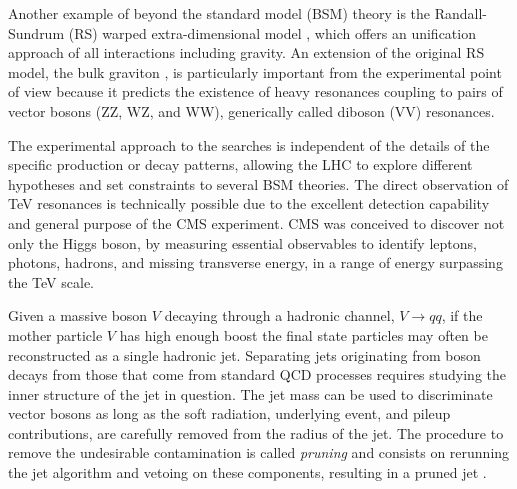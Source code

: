 Another example of beyond the standard model (BSM) theory is the Randall-Sundrum (RS) warped extra-dimensional model \cite{Randall:1999ee,Randall:1999vf}, which offers an unification approach of all interactions including gravity. An extension of the original RS model, the bulk graviton \cite{Agashe:2007zd}, is particularly important from the experimental point of view because it predicts the existence of heavy resonances coupling to pairs of vector bosons (ZZ, WZ, and WW), generically called diboson (VV) resonances.

The experimental approach to the searches is independent of the details of the specific production or decay patterns, allowing the LHC to explore different hypotheses and set constraints to several BSM theories. The direct observation of TeV resonances is technically possible due to the excellent detection capability and general purpose of the CMS experiment. CMS was conceived to discover not only the Higgs boson, by measuring essential observables to identify leptons, photons, hadrons, and missing transverse energy, in a range of energy surpassing the TeV scale. 

Given a massive boson $V$ decaying through a hadronic channel, $V \rightarrow qq$, if the mother particle $V$ has high enough boost the final state particles may often be reconstructed as a single hadronic jet. Separating jets originating from boson decays from those that come from standard QCD processes requires studying the inner structure of the jet in question. The jet mass can be used to discriminate vector bosons as long as the soft radiation, underlying event, and pileup contributions, are carefully removed from the radius of the jet. The procedure to remove the undesirable contamination is called \emph{pruning} and consists on rerunning the jet algorithm and vetoing on these components, resulting in a pruned jet \cite{Ellis:2009su}.


